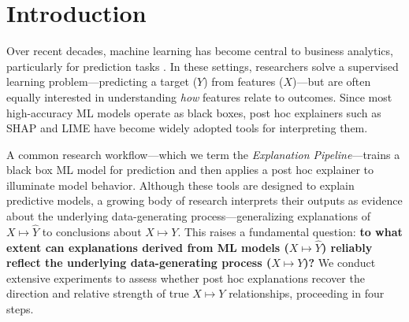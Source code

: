\documentclass[11pt]{article}
\begin{document}




\vspace{-0.1cm}
\section{Introduction}
\vspace{-0.1cm}
Over recent decades, machine learning has become central to business analytics, particularly for prediction tasks \citep{kleinberg2015prediction,mullainathan17applied}. In these settings, researchers solve a supervised learning problem—predicting a target ($Y$) from features ($X$)—but are often equally interested in understanding \textit{how} features relate to outcomes. Since most high-accuracy ML models operate as black boxes, post hoc explainers such as SHAP \citep{lundberg17shap} and LIME \citep{ribeiro16lime} have become widely adopted tools for interpreting them.

A common research workflow—which we term the \emph{Explanation Pipeline}—trains a black box ML model for prediction and then applies a post hoc explainer to illuminate model behavior. %
Although these tools are designed to explain predictive models, a growing body of research interprets their outputs as evidence about the underlying data-generating process—generalizing explanations of $X \mapsto \hat{Y}$ to conclusions about $X \mapsto Y$. %
This raises a fundamental question: \textbf{to what extent can explanations derived from ML models ($X \mapsto \hat{Y}$) reliably reflect the underlying data-generating process ($X \mapsto Y$)?} We conduct extensive experiments to assess whether post hoc explanations recover the direction and relative strength of true $X \mapsto Y$ relationships, proceeding in four steps.
\end{document}
